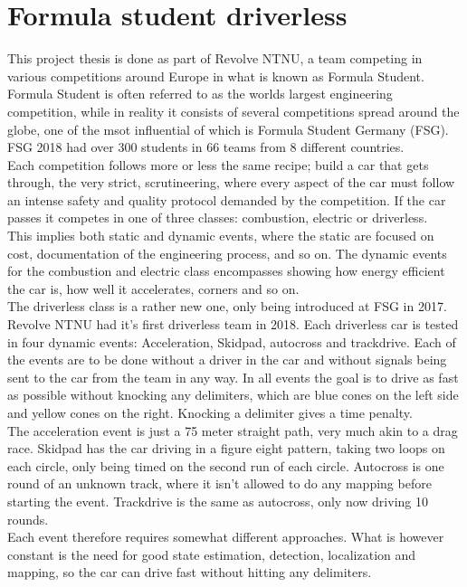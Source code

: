 \section{Formula student driverless}

This project thesis is done as part of Revolve NTNU, a team competing in various competitions around Europe in what is known as Formula Student. Formula Student is often referred to as the worlds largest engineering competition, while in reality it consists of several competitions spread around the globe, one of the msot influential of which is Formula Student Germany (FSG). FSG 2018 had over 300 students in 66 teams from 8 different countries. \\

Each competition follows more or less the same recipe; build a car that gets through, the very strict, scrutineering, where every aspect of the car must follow an intense safety and quality protocol demanded by the competition. If the car passes it competes in one of three classes: combustion, electric or driverless. \\ 

This implies both static and dynamic events, where the static are focused on cost, documentation of the engineering process, and so on. The dynamic events for the combustion and electric class encompasses showing how energy efficient the car is, how well it accelerates, corners and so on. \\ 

The driverless class is a rather new one, only being introduced at FSG in 2017. Revolve NTNU had it's first driverless team in 2018. Each driverless car is tested in four dynamic events: Acceleration, Skidpad, autocross and trackdrive. Each of the events are to be done without a driver in the car and without signals being sent to the car from the team in any way. In all events the goal is to drive as fast as possible without knocking any delimiters, which are blue cones on the left side and yellow cones on the right. Knocking a delimiter gives a time penalty.\\

The acceleration event is just a 75 meter straight path, very much akin to a drag race. Skidpad has the car driving in a figure eight pattern, taking two loops on each circle, only being timed on the second run of each circle. Autocross is one round of an unknown track, where it isn't allowed to do any mapping before starting the event. Trackdrive is the same as autocross, only now driving 10 rounds. \\

Each event therefore requires somewhat different approaches. What is however constant is the need for good state estimation, detection, localization and mapping, so the car can drive fast without hitting any delimiters.